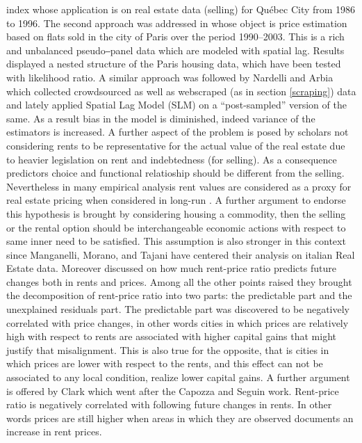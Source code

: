 \documentclass[
  12pt,
  a4paper,
  oneside]{book}
\theoremstyle{definition}
\theoremstyle{definition}
\theoremstyle{definition}
\theoremstyle{remark}
\begin{document}
index whose application is on real estate data (selling) for Québec City from 1986 to 1996. The second approach was addressed in \citet{baltagiparis} whose object is price estimation based on flats sold in the city of Paris over the period 1990--2003. This is a rich and unbalanced pseudo‒panel data which are modeled with spatial lag. Results displayed a nested structure of the Paris housing data, which have been tested with likelihood ratio. A similar approach was followed by Nardelli and Arbia \citep{arbia2020spatial} which collected crowdsourced as well as webscraped (as in section \ref{scraping}) data and lately applied Spatial Lag Model (SLM) on a ``post-sampled'' \citep{arbia2020postsampling} version of the same. As a result bias in the model is diminished, indeed variance of the estimators is increased. A further aspect of the problem is posed by scholars not considering rents to be representative for the actual value of the real estate due to heavier legislation on rent and indebtedness (for selling). As a consequence predictors choice and functional relatioship should be different from the selling. Nevertheless in many empirical analysis rent values are considered as a proxy for real estate pricing when considered in long-run \citep{Herath_Maier_2011}. A further argument to endorse this hypothesis is brought by \citet{sellingVSrental} considering housing a commodity, then the selling or the rental option should be interchangeable economic actions with respect to same inner need to be satisfied. This assumption is also stronger in this context since Manganelli, Morano, and Tajani have centered their analysis on italian Real Estate data. Moreover \citet{Capozza_Seguin_1996} discussed on how much rent-price ratio predicts future changes both in rents and prices. Among all the other points raised they brought the decomposition of rent-price ratio into two parts: the predictable part and the unexplained residuals part. The predictable part was discovered to be negatively correlated with price changes, in other words cities in which prices are relatively high with respect to rents are associated with higher capital gains that might justify that misalignment. This is also true for the opposite, that is cities in which prices are lower with respect to the rents, and this effect can not be associated to any local condition, realize lower capital gains. A further argument is offered by Clark \citep{Clark_1995} which went after the Capozza and Seguin work. Rent-price ratio is negatively correlated with following future changes in rents. In other words prices are still higher when areas in which they are observed documents an increase in rent prices.
\end{document}
